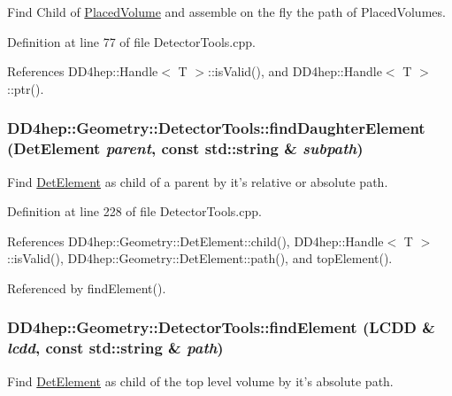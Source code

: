 Find Child of \hyperlink{class_d_d4hep_1_1_geometry_1_1_placed_volume}{PlacedVolume} and assemble on the fly the path of PlacedVolumes. 

Definition at line 77 of file DetectorTools.cpp.

References DD4hep::Handle$<$ T $>$::isValid(), and DD4hep::Handle$<$ T $>$::ptr().\hypertarget{namespace_d_d4hep_1_1_geometry_1_1_detector_tools_a142393e7b88829aee063f35a8e7cb984}{
\subsubsection[{findDaughterElement}]{ DD4hep::Geometry::DetectorTools::findDaughterElement ({\bf DetElement} {\em parent}, \/  const std::string \& {\em subpath})}}
\label{namespace_d_d4hep_1_1_geometry_1_1_detector_tools_a142393e7b88829aee063f35a8e7cb984}


Find \hyperlink{class_d_d4hep_1_1_geometry_1_1_det_element}{DetElement} as child of a parent by it's relative or absolute path. 

Definition at line 228 of file DetectorTools.cpp.

References DD4hep::Geometry::DetElement::child(), DD4hep::Handle$<$ T $>$::isValid(), DD4hep::Geometry::DetElement::path(), and topElement().

Referenced by findElement().\hypertarget{namespace_d_d4hep_1_1_geometry_1_1_detector_tools_a70cde605976780186eb6b226731ed380}{
\subsubsection[{findElement}]{ DD4hep::Geometry::DetectorTools::findElement ({\bf LCDD} \& {\em lcdd}, \/  const std::string \& {\em path})}}
\label{namespace_d_d4hep_1_1_geometry_1_1_detector_tools_a70cde605976780186eb6b226731ed380}


Find \hyperlink{class_d_d4hep_1_1_geometry_1_1_det_element}{DetElement} as child of the top level volume by it's absolute path. 

